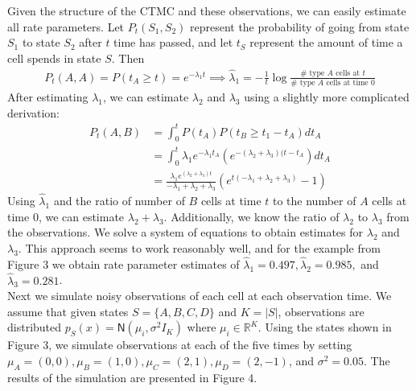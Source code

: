 \documentclass[11pt,onecolumn]{article}
\begin{document}
Given the structure of the CTMC and these observations, we can easily estimate all rate parameters. Let $P_t(S_1,S_2)$ represent the probability of going from state $S_1$ to state $S_2$ after $t$ time has passed, and let $t_S$ represent the amount of time a cell spends in state $S$. Then
\begin{align*}
	P_t(A,A) = P(t_A \geq t) = e^{-\lambda_1 t} \implies \hat{\lambda}_1 = -\frac{1}{t} \log \frac{\# \mbox{ type $A$ cells at $t$}}{\# \mbox{ type $A$ cells at time 0}}
\end{align*}
After estimating $\lambda_1$, we can estimate $\lambda_2$ and $\lambda_3$ using a slightly more complicated derivation:
\begin{align*}
	P_t(A,B) & = \int_0^t P(t_A) P(t_B \geq t_1 - t_A) dt_A \\
	& = \int_0^t \lambda_1 e^{-\lambda_1 t_A} (e^{-(\lambda_2+\lambda_3)(t-t_A})dt_A \\
	& = \frac{\lambda_1 e^{(\lambda_2+\lambda_3)t}}{-\lambda_1+\lambda_2 + \lambda_3} \left(e^{t(-\lambda_1 + \lambda_2 + \lambda_3)}-1 \right)
\end{align*}
Using $\hat{\lambda}_1$ and the ratio of number of $B$ cells at time $t$ to the number of $A$ cells at time 0, we can estimate $\lambda_2 + \lambda_3$. Additionally, we know the ratio of $\lambda_2$ to $\lambda_3$ from the observations. We solve a system of equations to obtain estimates for $\lambda_2$ and $\lambda_3$. This approach seems to work reasonably well, and for the example from Figure 3 we obtain rate parameter estimates of $\hat{\lambda}_1 = 0.497, \hat{\lambda}_2 = 0.985,$ and $\hat{\lambda}_3 = 0.281$. \\

Next we simulate noisy observations of each cell at each observation time. We assume that given states $S = \{A,B,C,D\}$ and $K = |S|$, observations are distributed $p_S(x) = \textsf{N}(\mu_i,\sigma^2 I_K)$ where $\mu_i \in \mathbb{R}^K$. Using the states shown in Figure 3, we simulate observations at each of the five times by setting $\mu_A = (0,0), \mu_B = (1,0), \mu_C = (2,1), \mu_D = (2,-1)$, and $\sigma^2 = 0.05$. The results of the simulation are presented in Figure 4. \\
\end{document}

